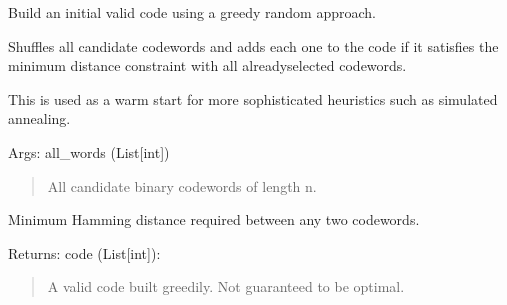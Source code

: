 \documentclass[letterpaper,10pt,english]{sphinxmanual}
\begin{document}

\begin{fulllineitems}
\label{\detokenize{index:hammindist.functions.greedy_start}}
\pysigstartsignatures
\pysiglinewithargsret
{}
{\sphinxparamcomma {}}
{}
\pysigstopsignatures
\sphinxAtStartPar
Build an initial valid code using a greedy random approach.

\sphinxAtStartPar
Shuffles all candidate codewords and adds each one to the code
if it satisfies the minimum distance constraint with all
already\sphinxhyphen{}selected codewords.

\sphinxAtStartPar
This is used as a warm start for more sophisticated heuristics
such as simulated annealing.

\sphinxAtStartPar
Args:
all\_words (List{[}int{]})
\begin{quote}

\sphinxAtStartPar
All candidate binary codewords of length n.
\end{quote}
\begin{description}
\sphinxAtStartPar
Minimum Hamming distance required between any two codewords.

\end{description}

\sphinxAtStartPar
Returns:
code (List{[}int{]}):
\begin{quote}

\sphinxAtStartPar
A valid code built greedily. Not guaranteed to be optimal.
\end{quote}

\end{fulllineitems}

\end{document}

